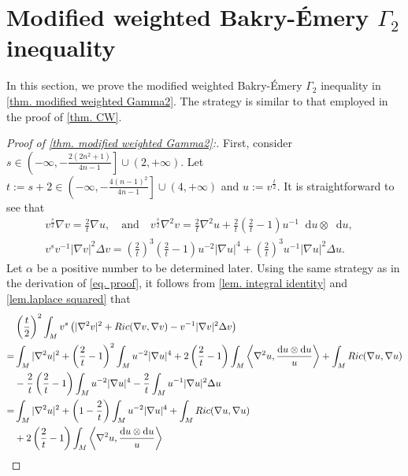 \documentclass[11pt]{amsart}
\numberwithin{equation}{section}
\numberwithin{lemma}{section}
\numberwithin{proposition}{section}
\numberwithin{corollary}{section}
\numberwithin{remark}{section}
\newcommand{\dd}{\mathop{}\!\mathrm{d}}%
\begin{document}
        \section{Modified weighted Bakry-\'Emery $\Gamma_2$ inequality}\label{sec. modified weighted Gamma2}
        In this section, we prove the modified weighted Bakry-\'Emery $\Gamma_2$ inequality in \cref{thm. modified weighted Gamma2}. The strategy is similar to that employed in the proof of \cref{thm. CW}.
        \begin{proof}[Proof of \cref{thm. modified weighted Gamma2}:]
     First, consider $s\in\left(-\infty,-\frac{2(2n^2+1)}{4n-1}\right]\cup(2,+\infty)$. Let $t:=s+2\in\left(-\infty,-\frac{4(n-1)^2}{4n-1}\right]\cup(4,+\infty)$ and $u:=v^{\frac{t}{2}}$. It is straightforward to see that
 \begin{align*}
        v^{\frac{s}{2}} \nabla v
        =\frac{2}{t}\nabla u,\quad \text{and}\quad
        v^{\frac{s}{2}}\nabla^2v
        =\frac{2}{t}\nabla^2 u+
        \frac{2}{t}\left(\frac{2}{t}-1\right)
        u^{-1}\dd u\otimes \dd u
        ,\quad 
        \\
        v^sv^{-1}|\nabla v|^2\Delta v
        =\left(\frac{2}{t}\right)^3\left(\frac{2}{t}-1\right)u^{-2}|\nabla u|^4
        +\left(\frac{2}{t}\right)^3u^{-1}|\nabla u|^2\Delta u.
 \end{align*}
 Let $\alpha $ be a positive number to be determined later. Using the same strategy as in the derivation of \cref{eq. proof}, it follows from \cref{lem. integral identity} and \cref{lem.laplace squared} that
 \begin{align}
     & \left(\frac{t}{2}\right)^2
     \int_{M} v^s
     \left(|\nabla^2 v|^2
     +Ric(\nabla v,\nabla v)
     -v^{-1}|\nabla v|^2\Delta v
     \right)\notag\\
     =&\int_M |\nabla^2 u|^2
     +\left(\frac{2}{t}-1\right)^2\int_Mu^{-2}|\nabla u|^4
     +2\left(\frac{2}{t}-1\right)\int_M
     \left\langle\nabla^2 u,\frac{\dd u\otimes\dd u}{u}\right\rangle
     +\int_M Ric(\nabla u,\nabla u)\notag\\
     &-\frac{2}{t}\left(\frac{2}{t}-1\right)\int_M
     u^{-2}|\nabla u|^4
     -\frac{2}{t}\int_M
     u^{-1}|\nabla u|^2\Delta u\notag\\
     =&\int_M|\nabla^2 u|^2
     +\left(1-\frac{2}{t}\right)\int_M
     u^{-2}|\nabla u|^4
     +\int_M Ric(\nabla u,\nabla u)
     \notag\\
     &+2\left(\frac{2}{t}-1\right)\int_M
     \left\langle\nabla^2 u,\frac{\dd u\otimes\dd u}{u}\right\rangle

\end{align}
\end{proof}
\end{document}
